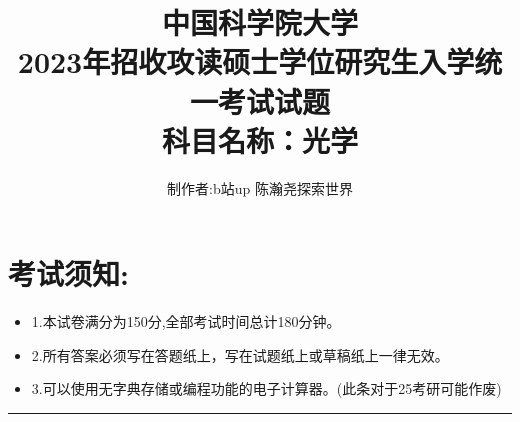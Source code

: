 \documentclass[11pt,a4paper]{article}
\begin{document}
    \title{中国科学院大学\\2023年招收攻读硕士学位研究生入学统一考试试题\\科目名称：光学}
    \author{制作者:b站up 陈瀚尧探索世界}
    \date{}
    \maketitle
    \titleformat{\section}[block]{\normalfont\Large\bfseries}{}{0pt}{}


    \section{考试须知:}
    \begin{itemize}[topsep=0pt,itemsep=0pt,partopsep=0pt]
        \item 1.本试卷满分为150分,全部考试时间总计180分钟。
        \vspace{-3mm}
        \item 2.所有答案必须写在答题纸上，写在试题纸上或草稿纸上一律无效。
        \vspace{-3mm}
        \item 3.可以使用无字典存储或编程功能的电子计算器。(此条对于25考研可能作废)
    \end{itemize}
    \vspace{-5mm}
    \noindent\rule{\textwidth}{0.5pt} %
    \vspace{-12mm}
\end{document}
